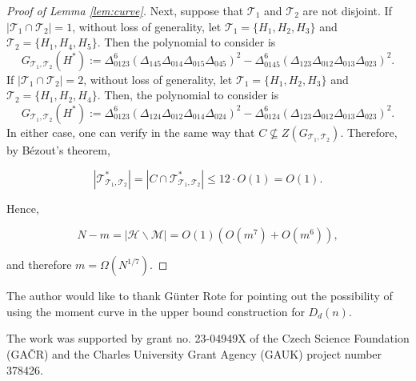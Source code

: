 \documentclass[a4paper,oneside,10pt]{amsart}
\begin{document}
\begin{proof}[Proof of Lemma \ref{lem:curve}]
Next, suppose that $\mathcal{T}_1$ and $\mathcal{T}_2$ are not disjoint.
If $|\mathcal{T}_1 \cap \mathcal{T}_2| = 1$, without loss of generality, let $\mathcal{T}_1 = \{ H_1, H_2, H_3 \}$ and $\mathcal{T}_2 = \{H_1, H_4, H_5 \}$. Then the polynomial to consider is
$$
G_{\mathcal{T}_1, \mathcal{T}_2} (H^{*})  :=  \Delta_{0123}^6 (\Delta_{145} \Delta_{014} \Delta_{015} \Delta_{045})^2 - \Delta_{0145}^6 (\Delta_{123} \Delta_{012} \Delta_{013} \Delta_{023})^2.
$$
If $|\mathcal{T}_1 \cap \mathcal{T}_2| = 2$, without loss of generality, let $\mathcal{T}_1 = \{ H_1, H_2, H_3 \}$ and $\mathcal{T}_2 = \{H_1, H_2, H_4 \}$. Then, the polynomial to consider is
$$
G_{\mathcal{T}_1, \mathcal{T}_2} (H^{*})  :=  \Delta_{0123}^6 (\Delta_{124} \Delta_{012} \Delta_{014} \Delta_{024})^2 - \Delta_{0124}^6 (\Delta_{123} \Delta_{012} \Delta_{013} \Delta_{023})^2.
$$
In either case, one can verify in the same way that $C \nsubseteq  Z(G_{\mathcal{T}_1,\mathcal{T}_2})$.
Therefore, by Bézout's theorem,

$$
|\mathcal{T}_{\mathcal{T}_1, \mathcal{T}_2}^{*}| = |C \cap \mathcal{T}_{\mathcal{T}_1, \mathcal{T}_2}^{*}| \leq 12 \cdot O(1) = O(1).
$$

Hence,

$$
N - m = |\mathcal{H} \backslash \mathcal{M}| = O(1) (O(m^7) + O(m^6)),
$$

and therefore $m = \Omega(N^{1/7})$.
\end{proof}


\medskip
{} 
The author would like to thank G\"{u}nter Rote for pointing out the possibility of using the moment curve in the upper bound construction for $D_d(n)$.

The work was supported by grant no. 23-04949X of the Czech Science Foundation (GA\v{C}R) and the Charles University Grant Agency (GAUK) project number 378426.

\typeout{}


\end{document}
